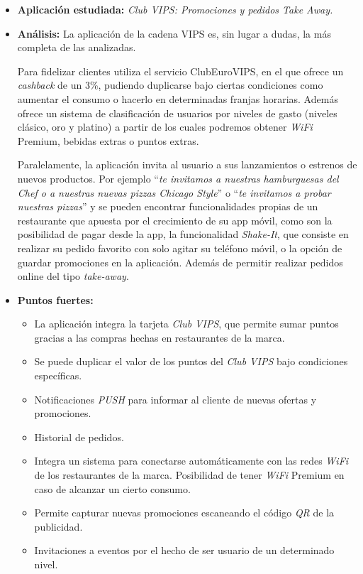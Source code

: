 \documentclass[twoside]{report}
\begin{document}
\begin{itemize}
\item \textbf{Aplicación estudiada:} \cite{vipsapp} \textit{Club VIPS: Promociones y pedidos Take Away.}
\item \textbf{Análisis:} 
La aplicación de la cadena VIPS es, sin lugar a dudas, la más completa de las analizadas.

Para fidelizar clientes utiliza el servicio ClubEuroVIPS, en el que ofrece un \textit{cashback} de un 3\%, pudiendo duplicarse bajo ciertas condiciones como aumentar el consumo o hacerlo en determinadas franjas horarias. Además ofrece un sistema de clasificación de usuarios por niveles de gasto (niveles clásico, oro y platino) a partir de los cuales podremos obtener \textit{WiFi} Premium, bebidas extras o puntos extras.

Paralelamente, la aplicación invita al usuario a sus lanzamientos o estrenos de nuevos productos. Por ejemplo “\textit{te invitamos a nuestras hamburguesas del Chef o a nuestras nuevas pizzas Chicago Style}” o “\textit{te invitamos a probar nuestras pizzas}” y se pueden encontrar funcionalidades propias de un restaurante que apuesta por el crecimiento de su app móvil, como son la posibilidad de pagar desde la app, la funcionalidad \textit{Shake-It}, que consiste en realizar su pedido favorito con solo agitar su teléfono móvil, o la opción de guardar promociones en la aplicación. Además de permitir realizar pedidos online del tipo \textit{take-away}.
\item \textbf{Puntos fuertes:}
	\begin{itemize}
	\item La aplicación integra la tarjeta \textit{Club VIPS}, que permite sumar puntos gracias a las compras hechas en restaurantes de la marca.
	\item Se puede duplicar el valor de los puntos del  \textit{Club VIPS} bajo condiciones específicas.
	\item Notificaciones \textit{PUSH} para informar al cliente de nuevas ofertas y promociones.
	\item Historial de pedidos.
	\item Integra un sistema para conectarse automáticamente con las redes \textit{WiFi} de los restaurantes de la marca. Posibilidad de tener \textit{WiFi} Premium en caso de alcanzar un cierto consumo.
	\item Permite capturar nuevas promociones escaneando el código \textit{QR} de la publicidad.
	\item Invitaciones a eventos por el hecho de ser usuario de un determinado nivel.

\end{itemize}
\end{itemize}
\end{document}
